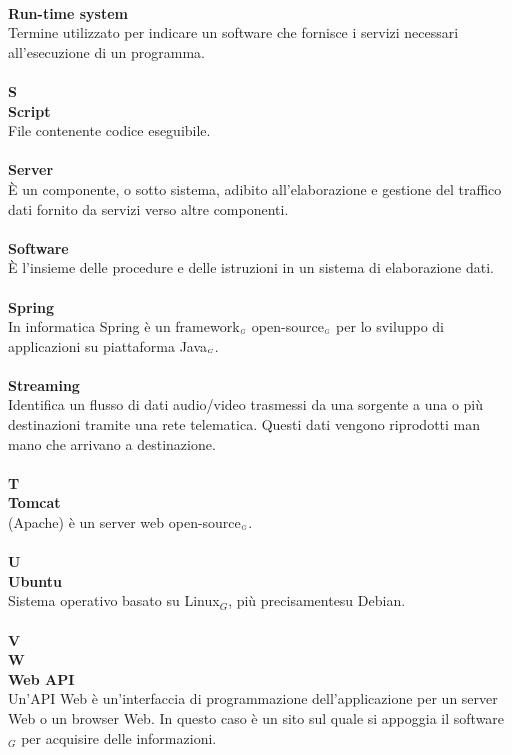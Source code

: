 \\
\textbf{Run-time system}\\
Termine utilizzato per indicare un software che fornisce i servizi necessari all'esecuzione di un programma.\\
\\
\textbf{S}
\\
\textbf{Script}\\
File contenente codice eseguibile.\\
\\
\textbf{Server}\\
È un componente, o sotto sistema, adibito all'elaborazione e gestione del traffico dati fornito da servizi verso altre componenti.\\
\\
\textbf{Software}\\
È l'insieme delle procedure e delle istruzioni in un sistema di elaborazione dati.\\
\\
\textbf{Spring}\\
In informatica Spring è un framework$_{\scaleto{G}{3pt}}$ open-source$_{\scaleto{G}{3pt}}$ per lo sviluppo di applicazioni su piattaforma Java$_{\scaleto{G}{3pt}}$.\\
\\
\textbf{Streaming}\\
Identifica un flusso di dati audio/video trasmessi da una sorgente a una o più destinazioni tramite una rete telematica. Questi dati vengono riprodotti man mano che arrivano a destinazione.\\
\\
\textbf{T}\\
\textbf{Tomcat}\\
(Apache) è un server web open-source$_{\scaleto{G}{3pt}}$.\\
\\
\textbf{U}
\\
\textbf{Ubuntu}\\
Sistema operativo basato su Linux$_G$, più precisamentesu Debian.\\
\\
\textbf{V}
\\
\textbf{W}\\
\textbf{Web API}\\
Un'API Web è un'interfaccia di programmazione dell'applicazione per un server Web o un browser Web.
In questo caso è un sito sul quale si appoggia il software$_G$ per acquisire delle informazioni.\\
